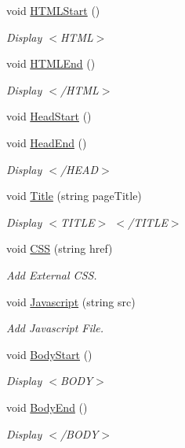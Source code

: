 \begin{DoxyCompactItemize}
void \hyperlink{classHTMLTags_a567551cd701d2836d4240b2917b5e13f}{H\-T\-M\-L\-Start} ()
\begin{DoxyCompactList}\small\item\em Display $<$\-H\-T\-M\-L$>$ \end{DoxyCompactList}\item 
void \hyperlink{classHTMLTags_a6553c3d01ee194a1d157e6341333dee3}{H\-T\-M\-L\-End} ()
\begin{DoxyCompactList}\small\item\em Display $<$/\-H\-T\-M\-L$>$ \end{DoxyCompactList}\item 
void \hyperlink{classHTMLTags_af2b01cc08884af52e0b291d07035062e}{Head\-Start} ()
\item 
void \hyperlink{classHTMLTags_afdc779e46fac16cc79e4f0e87f621254}{Head\-End} ()
\begin{DoxyCompactList}\small\item\em Display $<$/\-H\-E\-A\-D$>$ \end{DoxyCompactList}\item 
void \hyperlink{classHTMLTags_a5128d6f1c6be5ac1689047fc9d0d159f}{Title} (string page\-Title)
\begin{DoxyCompactList}\small\item\em Display $<$\-T\-I\-T\-L\-E$>$ $<$/\-T\-I\-T\-L\-E$>$ \end{DoxyCompactList}\item 
void \hyperlink{classHTMLTags_a4e9e18580cc7f2b82c82e4f81e39be50}{C\-S\-S} (string href)
\begin{DoxyCompactList}\small\item\em Add External C\-S\-S. \end{DoxyCompactList}\item 
void \hyperlink{classHTMLTags_aea041d720f12a210615c95350774e6aa}{Javascript} (string src)
\begin{DoxyCompactList}\small\item\em Add Javascript File. \end{DoxyCompactList}\item 
void \hyperlink{classHTMLTags_af1fb7b90b9ebb83177da18aba1ef86a9}{Body\-Start} ()
\begin{DoxyCompactList}\small\item\em Display $<$\-B\-O\-D\-Y$>$ \end{DoxyCompactList}\item 
void \hyperlink{classHTMLTags_a7cae36bd3a0e6f35e89494e5cda64971}{Body\-End} ()
\begin{DoxyCompactList}\small\item\em Display $<$/\-B\-O\-D\-Y$>$ \end{DoxyCompactList}\item 

\end{DoxyCompactItemize}
